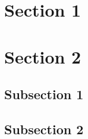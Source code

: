 \section{Section 1}

\lipsum[2-4]
\parencite{einstein}

\section{Section 2}

	\subsection{Subsection 1}

	\lipsum[5-10]

	\subsection{Subsection 2}

	\lipsum[11-14]